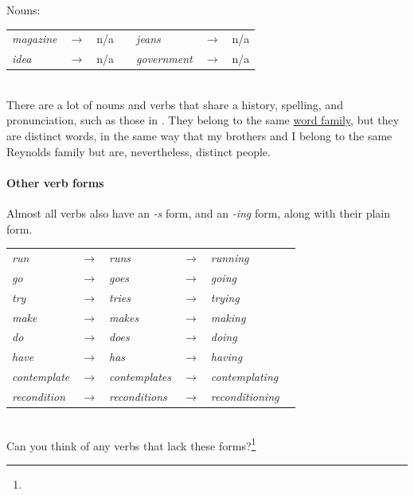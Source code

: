 Nouns:~
\begin{tabular}{@{} l l l l l l l}
\textit{magazine} & $\rightarrow$ & n/a && \textit{jeans} & $\rightarrow$ & n/a \\
\textit{idea} & $\rightarrow$ & n/a && \textit{government} & $\rightarrow$ & n/a \\
\end{tabular}\\
There are a lot of nouns and verbs that share a history, spelling, and pronunciation, such as those in . They belong to the same \href{sec:family-lemma-shape-token}{word family}, but they are distinct words, in the same way that my brothers and I belong to the same Reynolds family but are, nevertheless, distinct people.



\paragraph*{Other verb forms}
Almost all verbs also have an \textit{-s} form, and an \textit{-ing} form, along with their plain form.\\

\begin{tabular}{@{} l l l l l l}
    \textit{run} & $\rightarrow$ & \textit{runs} & $\rightarrow$ & \textit{running} & \\
    \textit{go} & $\rightarrow$ & \textit{goes} & $\rightarrow$ & \textit{going} & \\
    \textit{try} & $\rightarrow$ & \textit{tries} & $\rightarrow$ & \textit{trying} & \\
    \textit{make} & $\rightarrow$ & \textit{makes} & $\rightarrow$ & \textit{making} & \\
    \textit{do} & $\rightarrow$ & \textit{does} & $\rightarrow$ & \textit{doing} & \\
    \textit{have} & $\rightarrow$ & \textit{has} & $\rightarrow$ & \textit{having} & \\
    \textit{contemplate} & $\rightarrow$ & \textit{contemplates} & $\rightarrow$ & \textit{contemplating} & \\
    \textit{recondition} & $\rightarrow$ & \textit{reconditions} & $\rightarrow$ & \textit{reconditioning} & \\
\end{tabular}\\

Can you think of any verbs that lack these forms?\footnote{
}


